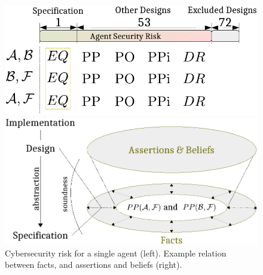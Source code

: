 \documentclass[runningheads]{llncs}
\begin{document}
\begin{figure}[t]
\begin{minipage}[t]{0.5\textwidth}
\includegraphics[width=.9\columnwidth]{quantitative.pdf}
\end{minipage}
\begin{minipage}[t]{0.5\textwidth}
\includegraphics[width=.9\columnwidth]{soundness.pdf}
\end{minipage}
  \caption{Cybersecurity risk for a single agent (left). Example relation between facts, and assertions and beliefs (right).}
\label{fig:quantitative}
\label{fig:soundness}
\end{figure}
\end{document}
